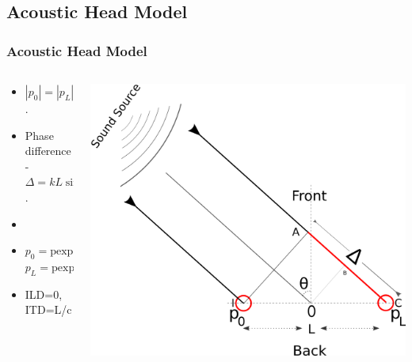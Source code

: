 \documentclass{beamer}
\begin{document}
\subsection{Acoustic Head Model}
\begin{frame}[t]
 \frametitle{Acoustic Head Model}
 \begin{columns}
     \begin{column}{.5\textwidth}
    \small
    \flushleft
     \hspace{2pt}
     
     \begin{itemize}
      \item<2> $|p_0|=|p_L|$.
      \item<2> Phase difference - $\Delta=kL\sin\theta$.
      \item[]
       \item<3>[$\bullet$] $p_0=\mbox{p}\mathrm{ exp}\left(- j\Delta/2\right)$\\ $p_L=\mbox{p}\mathrm{ exp}\left(j\Delta/2\right)$
      \item<3>[$\bullet$] ILD=0, ITD=L/c
      \end{itemize}

    \end{column}
    
    
 \begin{column}{0.5\textwidth}
    \includegraphics[width = 6 cm]{Diagrams/Presentation/acousticheadmodelold.png}\\
    \end{column}

    \end{columns}
\end{frame}
\end{document}
